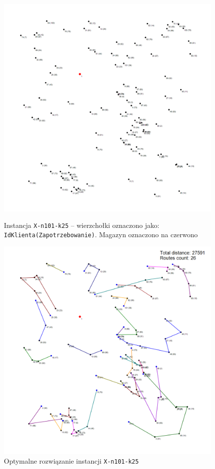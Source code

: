 \documentclass{article}
\begin{document}
\begin{figure}[H]
    \centering
    \begin{minipage}{0.48\textwidth}
        \centering
        \includegraphics[width=\linewidth]{img/20250405_224145_X-n101-k25.png}
        \caption{Instancja \texttt{X-n101-k25} -- wierzchołki oznaczono jako: \texttt{IdKlienta(Zapotrzebowanie)}. Magazyn oznaczono na czerwono}
        \label{fig:n101}
    \end{minipage}
    \hfill
    \begin{minipage}{0.48\textwidth}
        \centering
        \includegraphics[width=\linewidth]{img/20250407_002013_X-n101-k25_optimal.png}
        \caption{Optymalne rozwiązanie instancji \texttt{X-n101-k25}}
        \label{fig:n214}
    \end{minipage}
\end{figure}
\end{document}
